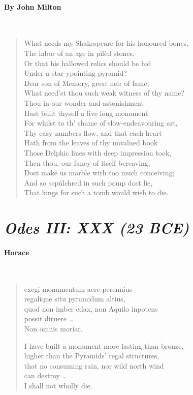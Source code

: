 \documentclass[10pt, letterpaper]{memoir}
\begin{document}
\paragraph{By John Milton}~
\begin{verse}
	What needs my Shakespeare for his honoured bones,\\
	The labor of an age in pilèd stones,\\
	Or that his hallowed relics should be hid\\
	Under a star-ypointing pyramid?\\
	Dear son of Memory, great heir of fame,\\
	What need’st thou such weak witness of thy name?\\
	Thou in our wonder and astonishment\\
	Hast built thyself a live-long monument.\\
	For whilst to th’ shame of slow-endeavouring art,\\
	Thy easy numbers flow, and that each heart\\
	Hath from the leaves of thy unvalued book\\
	Those Delphic lines with deep impression took,\\
	Then thou, our fancy of itself bereaving,\\
	Dost make us marble with too much conceiving;\\
	And so sepúlchred in such pomp dost lie,\\
	That kings for such a tomb would wish to die.
\end{verse}

\vspace{8em}
\hspace{0.3\linewidth}
\begin{minipage}{0.7\linewidth}
\section*{\emph{Odes III: XXX (23 BCE)}}
\paragraph{Horace}~
\begin{verse}
exegi monumentum aere perennius\\
regalique situ pyramidum altius,\\
quod non imber edax, non Aquilo inpotens\\
possit diruere \ldots\\
Non omnis moriar.

I have built a monument more lasting than bronze,\\
higher than the Pyramids’ regal structures,\\
that no consuming rain, nor wild north wind\\
can destroy \ldots\\
I shall not wholly die.
\end{verse}
\end{minipage}
\end{document}
